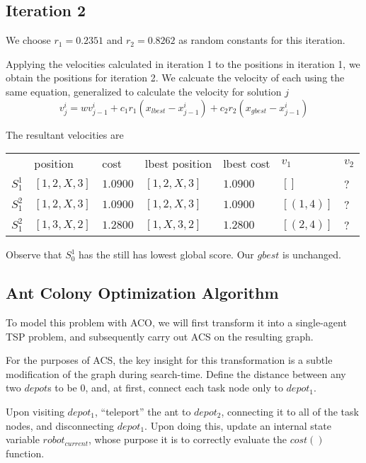 \documentclass[a4paper]{article}
\begin{document}
\subsection{Iteration 2}

We choose $r_1 = 0.2351$ and $r_2 = 0.8262$ as random constants for this iteration.

Applying the velocities calculated in iteration 1 to the positions in iteration 1, we obtain the positions for iteration 2. We calcuate the velocity of each using the same equation, generalized to calculate the velocity for solution $j$
$$v_j^i = w v_{j-1}^i + c_1 r_1 (x_\mathit{lbest} - x_{j-1}^i) + c_2 r_2 (x_\mathit{gbest} - x_{j-1}^i)$$

The resultant velocities are \mbox{}
\begin{center}
\begin{tabular}{lllllll}
        & position       & cost     & lbest position   & lbest cost   & $v_1$      & $v_2$    \\
$S_1^1$ & $[1, 2, X, 3]$ & $1.0900$ & $[1, 2, X, 3]$   & $1.0900$     & $[]      $ & ? \\
$S_1^2$ & $[1, 2, X, 3]$ & $1.0900$ & $[1, 2, X, 3]$   & $1.0900$     & $[(1, 4)]$ & ? \\
$S_1^2$ & $[1, 3, X, 2]$ & $1.2800$ & $[1, X, 3, 2]$   & $1.2800$     & $[(2, 4)]$ & ? \\
\end{tabular}
\end{center}

Observe that $S_0^1$ has the still has lowest global score. Our $\mathit{gbest}$ is unchanged.

\subsection{Ant Colony Optimization Algorithm} %

To model this problem with ACO, we will first transform it into a single-agent TSP problem, and subsequently carry out ACS on the resulting graph.

For the purposes of ACS, the key insight for this transformation is a subtle modification of the graph during search-time. Define the distance between any two $depot$s to be 0, and, at first, connect each task node only to $depot_1$.

Upon visiting $depot_1$, ``teleport'' the ant to $depot_2$, connecting it to all of the task nodes, and disconnecting $depot_1$. Upon doing this, update an internal state variable $robot_{current}$, whose purpose it is to correctly evaluate the $cost()$ function.
\end{document}
